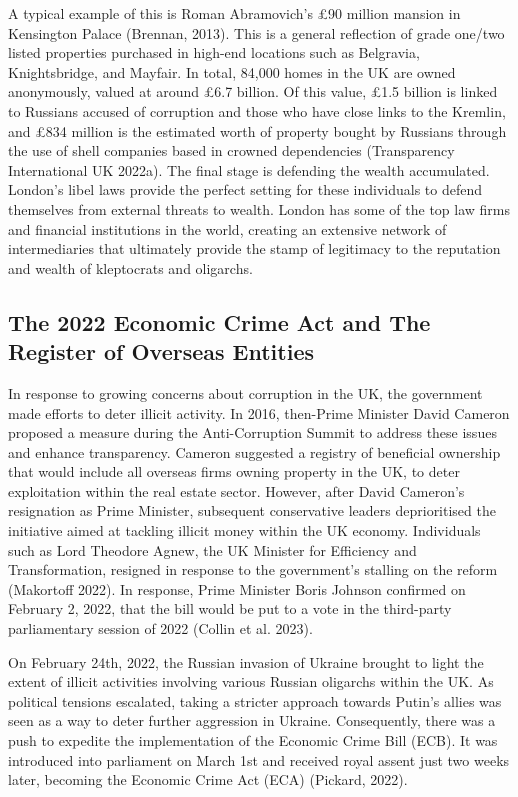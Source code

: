 \documentclass{article}
\begin{document}
A typical example of this is Roman Abramovich's £90 million mansion in Kensington Palace (Brennan, 2013). This is a general reflection of grade one/two listed properties purchased in high-end locations such as Belgravia, Knightsbridge, and Mayfair. In total, 84,000 homes in the UK are owned anonymously, valued at around £6.7 billion. Of this value, £1.5 billion is linked to Russians accused of corruption and those who have close links to the Kremlin, and £834 million is the estimated worth of property bought by Russians through the use of shell companies based in crowned dependencies (Transparency International UK 2022a). The final stage is defending the wealth accumulated. London's libel laws provide the perfect setting for these individuals to defend themselves from external threats to wealth. London has some of the top law firms and financial institutions in the world, creating an extensive network of intermediaries that ultimately provide the stamp of legitimacy to the reputation and wealth of kleptocrats and oligarchs.



\subsection{The 2022 Economic Crime Act and The Register of Overseas Entities}
In response to growing concerns about corruption in the UK, the government made efforts to deter illicit activity. In 2016, then-Prime Minister David Cameron proposed a measure during the Anti-Corruption Summit to address these issues and enhance transparency. Cameron suggested a registry of beneficial ownership that would include all overseas firms owning property in the UK, to deter exploitation within the real estate sector. However, after David Cameron's resignation as Prime Minister, subsequent conservative leaders deprioritised the initiative aimed at tackling illicit money within the UK economy. Individuals such as Lord Theodore Agnew, the UK Minister for Efficiency and Transformation, resigned in response to the government's stalling on the reform (Makortoff 2022). In response, Prime Minister Boris Johnson confirmed on February 2, 2022, that the bill would be put to a vote in the third-party parliamentary session of 2022 (Collin et al. 2023).

On February 24th, 2022, the Russian invasion of Ukraine brought to light the extent of illicit activities involving various Russian oligarchs within the UK. As political tensions escalated, taking a stricter approach towards Putin's allies was seen as a way to deter further aggression in Ukraine. Consequently, there was a push to expedite the implementation of the Economic Crime Bill (ECB). It was introduced into parliament on March 1st and received royal assent just two weeks later, becoming the Economic Crime Act (ECA) (Pickard, 2022).
\end{document}

